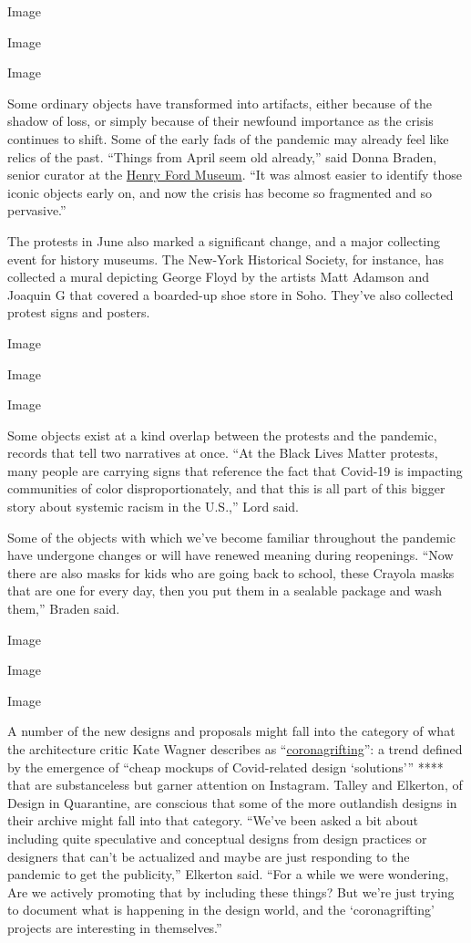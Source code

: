 Image

Image

Image

Some ordinary objects have transformed into artifacts, either because of
the shadow of loss, or simply because of their newfound importance as
the crisis continues to shift. Some of the early fads of the pandemic
may already feel like relics of the past. ``Things from April seem old
already,'' said Donna Braden, senior curator at the
\href{https://www.thehenryford.org}{Henry Ford Museum}. ``It was almost
easier to identify those iconic objects early on, and now the crisis has
become so fragmented and so pervasive.''

The protests in June also marked a significant change, and a major
collecting event for history museums. The New-York Historical Society,
for instance, has collected a mural depicting George Floyd by the
artists Matt Adamson and Joaquin G that covered a boarded-up shoe store
in Soho. They've also collected protest signs and posters.

Image

Image

Image

Some objects exist at a kind overlap between the protests and the
pandemic, records that tell two narratives at once. ``At the Black Lives
Matter protests, many people are carrying signs that reference the fact
that Covid-19 is impacting communities of color disproportionately, and
that this is all part of this bigger story about systemic racism in the
U.S.,'' Lord said.

Some of the objects with which we've become familiar throughout the
pandemic have undergone changes or will have renewed meaning during
reopenings. ``Now there are also masks for kids who are going back to
school, these Crayola masks that are one for every day, then you put
them in a sealable package and wash them,'' Braden said.

Image

Image

Image

A number of the new designs and proposals might fall into the category
of what the architecture critic Kate Wagner describes as
``\href{https://mcmansionhell.com/post/618938984050147328/coronagrifting-a-design-phenomenon}{coronagrifting}'':
a trend defined by the emergence of ``cheap mockups of Covid-related
design `solutions''' **** that are substanceless but garner attention on
Instagram. Talley and Elkerton, of Design in Quarantine, are conscious
that some of the more outlandish designs in their archive might fall
into that category. ``We've been asked a bit about including quite
speculative and conceptual designs from design practices or designers
that can't be actualized and maybe are just responding to the pandemic
to get the publicity,'' Elkerton said. ``For a while we were wondering,
Are we actively promoting that by including these things? But we're just
trying to document what is happening in the design world, and the
`coronagrifting' projects are interesting in themselves.''

